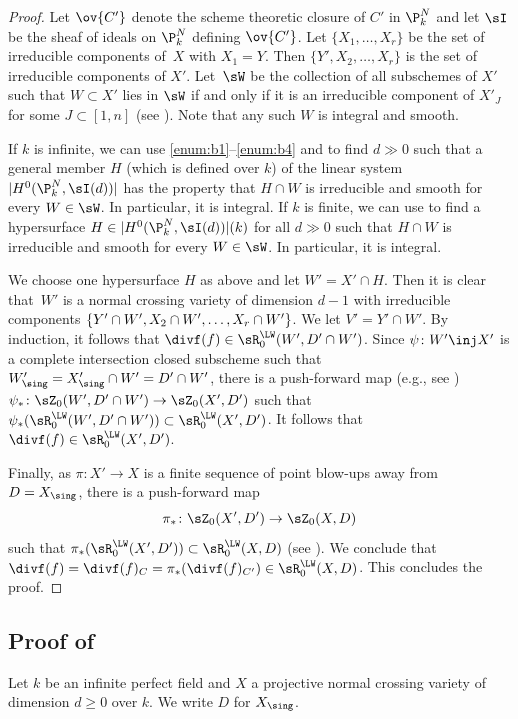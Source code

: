 \begin{proof}
Let $\ov{C'}$ denote the scheme theoretic closure of $C'$ in $\P^N_k$ and let
$\sI$ be the sheaf of ideals on $\P^N_k$ defining $\ov{C'}$.
Let $\{X_1, \ldots , X_r\}$ be the set of irreducible components of~$X$
with $X_1 = Y$. Then $\{Y', X_2, \ldots , X_r\}$ is the set of irreducible
components of $X'$.
Let~$\sW$ be the collection of all subschemes of $X'$ such that
$W \subset X'$ lies in $\sW$ if and only if it is an irreducible component
of $X'_J$ for some $J \subset [1,n]$ (see ).
Note that any such $W$ is integral and smooth.

If $k$ is infinite, we can use \eqref{enum:b1}--\eqref{enum:b4} and \cite[Th.\,3.12]{GK} to
find $d \gg 0$ such that a general member $H$ (which is defined over $k$) of
the linear system $|H^0(\P^N_k, \sI(d))|$ has the property that
$H \cap W$ is irreducible and smooth for every $W \in \sW$.
In particular, it is integral.
If $k$ is finite, we can use \cite[Prop.\,5.2, Th.\,8.4]{GK} to find a
hypersurface $H \in |H^0(\P^N_k, \sI(d))|(k)$ for all $d \gg 0$ such that
$H \cap W$ is irreducible and smooth for every $W \in \sW$.
In particular, it is integral.

We choose one hypersurface $H$ as above and let $W' = X' \cap H$. Then
it is clear that~$W'$ is a normal crossing variety of dimension $d-1$ with irreducible
components $\{Y' \cap\nobreak W', X_2 \cap W', \ldots , X_r \cap W'\}$.
We let $V' = Y' \cap W'$.
By induction, it follows that $\divf(f) \in \sR^{\LW}_0(W', D' \cap W')$.
Since $\psi \colon W' \inj X'$ is a complete intersection closed subscheme
such that $W'_{\sing} = X'_{\sing} \cap W' = D' \cap W'$, there is a
push-forward map (e.g., see \cite[Lem.\,3.10]{BK})
$\psi_* \colon \sZ_0(W', D' \cap W') \to \sZ_0(X',D')$
such that $\psi_*(\sR^{\LW}_0(W', D' \cap\nobreak W')) \subset \sR^{\LW}_0(X',D')$.
It follows that $\divf(f) \in \sR^{\LW}_0(X',D')$.

Finally, as $\pi \colon X' \to X$ is a finite sequence of point blow-ups away
from $D = X_{\sing}$,
there is a push-forward map
\[
\pi_* \colon \sZ_0(X', D') \to \sZ_0(X,D)
\]
such that $\pi_*(\sR^{\LW}_0(X', D')) \subset \sR^{\LW}_0(X,D)$
(see \cite[Lem.\,3.18]{BK}). We conclude that
$\divf(f) = \divf(f)_C = \pi_*(\divf(f)_{C'}) \in
\sR^{\LW}_0(X,D)$. This concludes the proof.
\end{proof}

\subsection{Proof of }\label{sec:Final}
Let $k$ be an infinite perfect field
and $X$ a projective normal crossing variety of dimension $d \ge 0$ over $k$.
We write $D$ for $X_\sing$.

